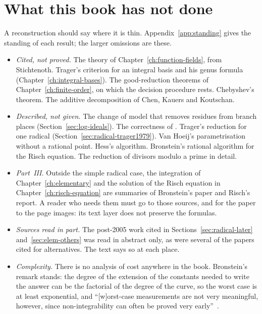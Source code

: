 \section{What this book has not done}\label{sec:impl-gaps}

A reconstruction should say where it is thin. Appendix~\ref{app:standing}
gives the standing of each result; the larger omissions are these.

\begin{itemize}
\item \emph{Cited, not proved.} The theory of Chapter~\ref{ch:function-fields},
  from Stichtenoth. Trager's criterion for an integral basis and his genus
  formula (Chapter~\ref{ch:integral-bases}). The good-reduction theorems of
  Chapter~\ref{ch:finite-order}, on which the decision procedure rests.
  Chebyshev's theorem. The additive decomposition of Chen, Kauers and
  Koutschan.
\item \emph{Described, not given.} The change of model that removes
  residues from branch places (Section~\ref{sec:log-ideals}). The
  correctness of . Trager's reduction for one radical
  (Section~\ref{sec:radical-trager1979}). Van Hoeij's parametrisation
  without a rational point. Hess's algorithm. Bronstein's rational
  algorithm for the Risch equation. The reduction of divisors modulo a prime
  in detail.
\item \emph{Part~III.} Outside the simple radical case, the integration of
  Chapter~\ref{ch:elementary} and the solution of the Risch equation in
  Chapter~\ref{ch:risch-equation} are summaries of Bronstein's paper and
  Risch's report. A reader who needs them must go to those sources, and for
  the paper to the page images: its text layer does not preserve the
  formulas.
\item \emph{Sources read in part.} The post-2005 work cited in
  Sections~\ref{sec:radical-later} and~\ref{sec:elem-others} was read in
  abstract only, as were several of the papers cited for alternatives. The
  text says so at each place.
\item \emph{Complexity.} There is no analysis of cost anywhere in the book.
  Bronstein's remark stands: the degree of the extension of the constants
  needed to write the answer can be the factorial of the degree of the
  curve, so the worst case is at least exponential, and ``[w]orst-case
  measurements are not very meaningful, however, since non-integrability can
  often be proved very early''~\cite[Conclusions]{bronstein1990}.
\end{itemize}
